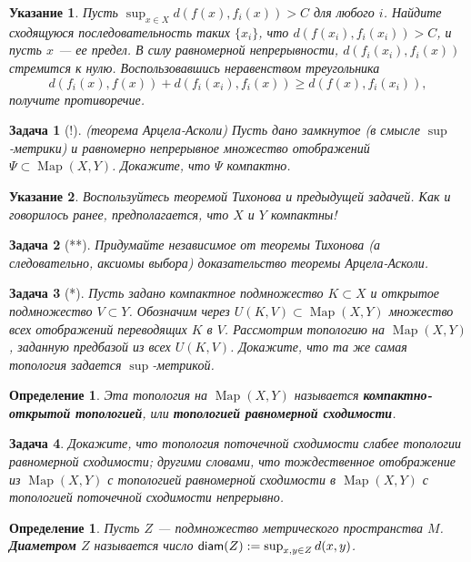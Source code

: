 \documentclass[12pt]{book}
\def\Map{\operatorname{Map}}
\newcommand{\diam}{{\sf diam}}
\theoremstyle{upshape}
\newtheorem{zadacha}{Задача}[chapter]
\theoremstyle{generic}
\newtheorem{opredelenie}[teorema]{Определение}
\theoremstyle{upshapenonumber}
\newtheorem{ukazanie}{Указание}[section]
\newcommand{\следствие}{%
     \refstepcounter{teorema}
     {\noindent\bf Следствие \thechapter.\arabic{teorema}:\ }}
\newcommand{\пример}{%
     \refstepcounter{teorema}
     {\noindent\bf Пример \thechapter.\arabic{teorema}:\ }}
\newcommand{\лемма}{%
     \refstepcounter{teorema}
     {\noindent\bf Лемма \thechapter.\arabic{teorema}:\ }}
\newcommand{\теорема}{%
     \refstepcounter{teorema}
     {\noindent\bf Теорема \thechapter.\arabic{teorema}:\ }}
\newcommand{\утверждение}{%
     \refstepcounter{teorema}
     {\noindent\bf Утверждение \thechapter.\arabic{teorema}:\ }}
\begin{document}
{\begin{ukazanie}
Пусть $\sup_{x\in X} d(f(x), f_i(x))>C$
для любого $i$. Найдите сходящуюся
последовательность
таких $\{x_i\}$, что $d(f(x_i), f_i(x_i))> C$,
и пусть $x$ --- ее предел.
В силу равномерной непрерывности, 
$d(f_i(x_i), f_i(x))$ стремится к нулю. 
Воспользовавшись неравенством треугольника
\[ 
d(f_i(x), f(x)) + d(f_i(x_i), f_i(x)) \geq d(f(x), f_i(x_i)),
\]
получите противоречие.
\end{ukazanie}

\begin{zadacha}[!] 
(теорема Арцела-Асколи)
Пусть дано замкнутое (в смысле $\sup$-метрики) и
равномерно непрерывное множество отображений
$\Psi\subset\Map(X,Y)$. Докажите, что $\Psi$ компактно.
\end{zadacha}

\begin{ukazanie}
Воспользуйтесь теоремой Тихонова и предыдущей задачей. Как 
и говорилось ранее, предполагается, что $X$ и $Y$ компактны!
\end{ukazanie}

\begin{zadacha}[**]
Придумайте независимое от теоремы Тихонова
(а следовательно, аксиомы выбора) доказательство
теоремы Арцела-Асколи.
\end{zadacha}

\begin{zadacha}[*]
Пусть задано компактное подмножество $K\subset X$
и открытое подмножество $V\subset Y$.
Обозначим через $U(K,V)\subset \Map(X,Y)$ множество
всех отображений переводящих $K$ в $V$.
Рассмотрим топологию на $\Map(X,Y)$,
заданную предбазой из всех $U(K,V)$.
Докажите, что та же самая топология
задается $\sup$-метрикой.
\end{zadacha}

\begin{opredelenie}
Эта топология на  $\Map(X,Y)$ называется 
{\bf компактно-открытой топологией}, или
{\bf топологией равномерной сходимости}.
\end{opredelenie}

\begin{zadacha}
Докажите, что топология поточечной сходимости
слабее топологии равномерной сходимости; другими
словами, что тождественное отображение из $\Map(X,Y)$
с топологией равномерной сходимости в 
$\Map(X,Y)$ с топологией поточечной сходимости
непрерывно.
\end{zadacha}

\begin{opredelenie}
Пусть $Z$ --- подмножество метрического пространства
$M$. {\bf Диаметром} $Z$ называется число 
$\diam(Z):= \sup_{x,y\in Z} d(x,y)$.
\end{opredelenie}

}
\end{document}
